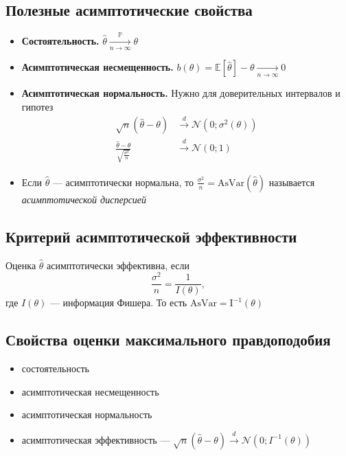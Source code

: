 \documentclass[a4paper, 10pt]{article}
\begin{document}
\subsection{Полезные асимптотические свойства}
\begin{itemize}
    \item \textbf{Состоятельность.} $\widehat{\theta}\underset{n\to\infty}{\overset{\mathbb{P}}{\longrightarrow}}\theta$
    \item \textbf{Асимптотическая несмещенность.} $b(\theta)=\mathbb{E}[\widehat{\theta}]-\theta\underset{n\to\infty}{\longrightarrow}0$
    \item \textbf{Асимптотическая нормальность.} Нужно для доверительных интервалов и гипотез
    \begin{equation*}
        \begin{aligned}
            \sqrt{n}(\widehat{\theta}-\theta) &\overset{d}{\longrightarrow} \mathcal{N}\left(0; \sigma^{2}(\theta)\right)\\
            \frac{\widehat{\theta}-\theta}{\sqrt{\frac{\sigma^{2}}{n}}} &\overset{d}{\longrightarrow} \mathcal{N}(0;1)
        \end{aligned}
    \end{equation*}
    \item {} Если $\widehat{\theta}$ — асимптотически нормальна, то $\displaystyle\frac{\sigma^2}{n}=\text{AsVar}(\widehat{\theta})$ называется \textit{асимптотической дисперсией}
\end{itemize}

\subsection{Критерий асимптотической эффективности}
Оценка $\widehat{\theta}$ асимптотически эффективна, если
\begin{equation*}
    \frac{\sigma^{2}}{n}=\frac{1}{I(\theta)},
\end{equation*}
где $I(\theta)$ — информация Фишера. То есть $\text{AsVar}=\mathrm{I}^{-1}(\theta)$

\subsection{Свойства оценки максимального правдоподобия}
\begin{itemize}
    \item состоятельность
    \item асимптотическая несмещенность
    \item асимптотическая нормальность
    \item асимптотическая эффективность — $\sqrt{n}(\widehat{\theta}-\theta) \overset{d}{\longrightarrow} \mathcal{N}\left(0; I^{-1}(\theta)\right)$
\end{itemize}
\end{document}
